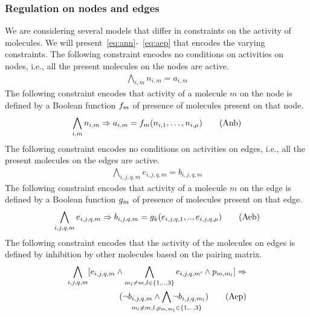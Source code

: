 \subsubsection{Regulation on nodes and edges}
We are considering several models that differ in constraints on
the activity of molecules.
%
We will present~\eqref{eq:ann}-~\eqref{eq:aep} that encodes
the varying constraints.
%
The following constraint encodes no conditions on activities on nodes,
i.e., all the present molecules on the nodes are active.
\begin{align}
\bigwedge\limits_{i,m} n_{i,m} = a_{i,m}    \tag{Ann}\label{eq:ann}
\end{align}
The following constraint encodes that activity of a molecule $m$ on the node is
defined by a Boolean function $f_m$ of presence of molecules present on that node.
\begin{align}
\bigwedge\limits_{i,m} n_{i,m} \Rightarrow a_{i,m} =  f_m (n_{i,1},\dots,n_{i,\mu}) 
\tag{Anb}\label{eq:anb}
\end{align}
The following constraint encodes no conditions on activities on edges,
i.e., all the present molecules on the edges are active.
\begin{align}
  \bigwedge\limits_{i,j,q,m} e_{i,j,q,m} = b_{i,j,q,m}
\tag{Aen}\label{eq:aen}
\end{align}
The following constraint encodes that activity of a molecule $m$ on the edge is
defined by a Boolean function $g_m$ of presence of molecules present on that edge.
\begin{align}
   \bigwedge\limits_{i,j,q,m} e_{i,j,q,m} \Rightarrow b_{i,j,q,m} = g_k(e_{i,j,q,1}, .., e_{i,j,q,\mu} )
  \tag{Aeb}\label{eq:aeb}
\end{align}
%
The following constraint encodes that the activity of the molecules on
edges is defined by inhibition by other molecules based on the pairing
matrix. 
\begin{align}
	\bigwedge\limits_{i,j,q, m}  [e_{i,j,q,m} \land \bigwedge_{m_l \neq m,l \in \{1,..,3\}} e_{i,j,q,m'} \land p_{m, m_l}] \limplies 
	\notag \\
	(\neg b_{i,j,q,m} \land \bigwedge_{\mathclap{m_l \neq m,l, p_{m, m_l} \in \{1,..,3\}}} \neg b_{i,j,q,m_l})
  \tag{Aep}\label{eq:aep}
\end{align}
%
